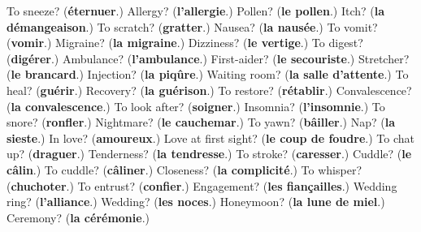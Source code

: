 \begin{tcolorbox}[breakable,colback=teal!4,colframe=teal!35!black,title={Before you move on}]
To sneeze? (\textbf{éternuer}.) Allergy? (\textbf{l'allergie}.) Pollen? (\textbf{le pollen}.) Itch? (\textbf{la démangeaison}.) To scratch? (\textbf{gratter}.) Nausea? (\textbf{la nausée}.) To vomit? (\textbf{vomir}.) Migraine? (\textbf{la migraine}.) Dizziness? (\textbf{le vertige}.) To digest? (\textbf{digérer}.) Ambulance? (\textbf{l'ambulance}.) First-aider? (\textbf{le secouriste}.) Stretcher? (\textbf{le brancard}.) Injection? (\textbf{la piqûre}.) Waiting room? (\textbf{la salle d'attente}.) To heal? (\textbf{guérir}.) Recovery? (\textbf{la guérison}.) To restore? (\textbf{rétablir}.) Convalescence? (\textbf{la convalescence}.) To look after? (\textbf{soigner}.) Insomnia? (\textbf{l'insomnie}.) To snore? (\textbf{ronfler}.) Nightmare? (\textbf{le cauchemar}.) To yawn? (\textbf{bâiller}.) Nap? (\textbf{la sieste}.) In love? (\textbf{amoureux}.) Love at first sight? (\textbf{le coup de foudre}.) To chat up? (\textbf{draguer}.) Tenderness? (\textbf{la tendresse}.) To stroke? (\textbf{caresser}.) Cuddle? (\textbf{le câlin}.) To cuddle? (\textbf{câliner}.) Closeness? (\textbf{la complicité}.) To whisper? (\textbf{chuchoter}.) To entrust? (\textbf{confier}.) Engagement? (\textbf{les fiançailles}.) Wedding ring? (\textbf{l'alliance}.) Wedding? (\textbf{les noces}.) Honeymoon? (\textbf{la lune de miel}.) Ceremony? (\textbf{la cérémonie}.)
\end{tcolorbox}
